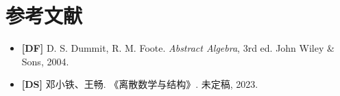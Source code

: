 \documentclass[UTF8,a4paper,11pt]{ctexart}
\begin{document}










\section*{参考文献}
\begin{itemize}
\item \textbf{[DF]} D. S. Dummit, R. M. Foote. \emph{Abstract Algebra}, 3rd ed. John Wiley \& Sons, 2004.
\item \textbf{[DS]} 邓小铁、王畅. 《离散数学与结构》. 未定稿, 2023.
\end{itemize}
\end{document}

